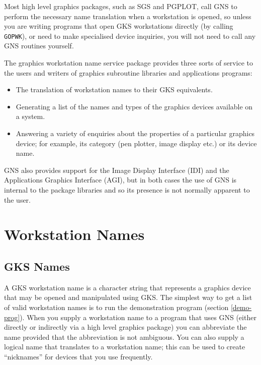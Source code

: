 Most high level graphics packages, such as SGS and PGPLOT, call GNS to
perform the necessary name translation when a workstation is opened, so
unless you are writing programs that open GKS workstations directly
(by calling {\tt GOPWK}), or need to make specialised device inquiries,
you will not need to call any GNS routines yourself.

The graphics workstation name service package provides three sorts of service
to the users and writers of graphics subroutine libraries and applications 
programs:

\begin{itemize}

\item The translation of workstation names to their GKS equivalents.

\item Generating a list of the names and types of the graphics devices
available on a system.

\item Answering a variety of enquiries about the properties of a particular
graphics device; for example, its category (pen plotter, image display
etc.) or its device name.

\end{itemize}

GNS also provides support for the Image Display Interface (IDI) and the
Applications Graphics Interface (AGI), but in both cases the use of GNS
is internal to the package libraries and so its presence is not normally
apparent to the user.

\section{Workstation Names}\label{wn}
\subsection{GKS Names}

A GKS workstation name is a character string that represents a graphics device
that may be opened and manipulated using GKS. 
The simplest way to get a list of valid workstation names is to run the
demonstration program (section \ref{demo-prog}).
When you supply a workstation name to a program that uses GNS (either directly
or indirectly via a high level graphics package) you can abbreviate the name
provided that the abbreviation is not ambiguous. You can also supply a
logical name that translates to a workstation name; this can be used to create
``nicknames'' for devices that you use frequently.

